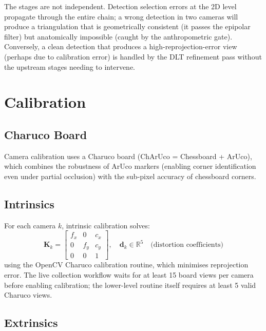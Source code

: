 \documentclass[11pt,a4paper]{article}
\newcommand{\R}{\mathbb{R}}
\begin{document}
The stages are not independent. Detection selection errors at the 2D level propagate
through the entire chain; a wrong detection in two cameras will produce a triangulation
that is geometrically consistent (it passes the epipolar filter) but anatomically
impossible (caught by the anthropometric gate). Conversely, a clean detection that
produces a high-reprojection-error view (perhaps due to calibration error) is handled
by the DLT refinement pass without the upstream stages needing to intervene.

\section{Calibration}

\subsection{Charuco Board}

Camera calibration uses a Charuco board (ChArUco = Chessboard + ArUco), which
combines the robustness of ArUco markers (enabling corner identification even under
partial occlusion) with the sub-pixel accuracy of chessboard corners.

\subsection{Intrinsics}

For each camera $k$, intrinsic calibration solves:
\begin{equation}
  \mathbf{K}_k = \begin{bmatrix} f_x & 0 & c_x \\ 0 & f_y & c_y \\ 0 & 0 & 1 \end{bmatrix},
  \quad \mathbf{d}_k \in \R^5 \quad \text{(distortion coefficients)}
\end{equation}
using the OpenCV Charuco calibration routine, which minimises reprojection error.
The live collection workflow waits for at least 15 board views per camera before
enabling calibration; the lower-level routine itself requires at least 5 valid
Charuco views.

\subsection{Extrinsics}
\end{document}
